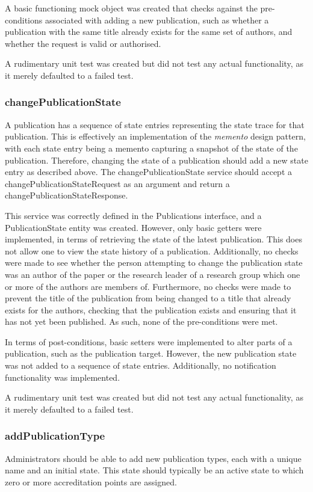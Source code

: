 \documentclass[a4paper,10pt]{article}
\begin{document}
A basic functioning mock object was created that checks against the pre-conditions associated with adding a new publication, such as whether a publication with the same title already exists for the same set of authors, and whether the request is valid or authorised.

A rudimentary unit test was created but did not test any actual functionality, as it merely defaulted to a failed test.

\subsubsection{changePublicationState}
A publication has a sequence of state entries representing the state trace for that publication. This is effectively an implementation of the \textit{memento} design pattern, with each state entry being a memento capturing a snapshot of the state of the publication. Therefore, changing the state of a publication should add a new state entry as described above. The changePublicationState service should accept a changePublicationStateRequest as an argument and return a changePublicationStateResponse.

This service was correctly defined in the Publications interface, and a PublicationState entity was created. However, only basic getters were implemented, in terms of retrieving the state of the latest publication. This does not allow one to view the state history of a publication. Additionally, no checks were made to see whether the person attempting to change the publication state was an author of the paper or the research leader of a research group which one or more of the authors are members of. Furthermore, no checks were made to prevent the title of the publication from being changed to a title that already exists for the authors, checking that the publication exists and ensuring that it has not yet been published. As such, none of the pre-conditions were met.

In terms of post-conditions, basic setters were implemented to alter parts of a publication, such as the publication target. However, the new publication state was not added to a sequence of state entries. Additionally, no notification functionality was implemented.

A rudimentary unit test was created but did not test any actual functionality, as it merely defaulted to a failed test.

\subsubsection{addPublicationType}
Administrators should be able to add new publication types, each with a unique name and an initial state. This state should typically be an active state to which zero or more accreditation points are assigned.
\end{document}
